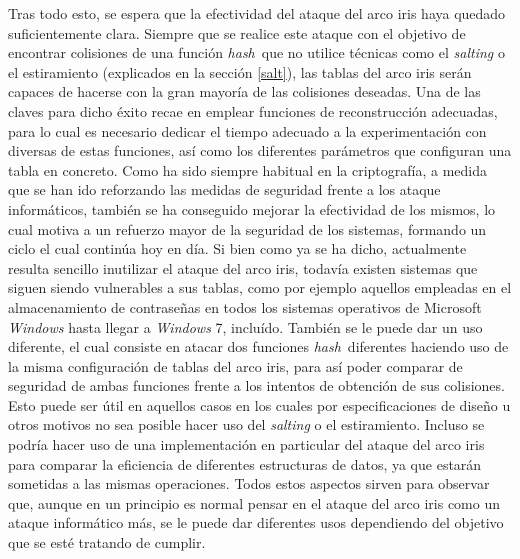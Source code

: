 \documentclass[12pt,spanish,listoffigures,listoftables,listofalgorithms]{tfgetsinf}
\newcommand{\hash}{\textit{hash}}
\begin{document}
Tras todo esto, se espera que la efectividad del ataque del arco iris haya quedado suficientemente clara. Siempre que se realice este ataque con el objetivo de encontrar colisiones de una función \hash~que no utilice técnicas como el \textit{salting} o el estiramiento (explicados en la sección \ref{salt}), las tablas del arco iris serán capaces de hacerse con la gran mayoría de las colisiones deseadas. Una de las claves para dicho éxito recae en emplear funciones de reconstrucción adecuadas, para lo cual es necesario dedicar el tiempo adecuado a la experimentación con diversas de estas funciones, así como los diferentes parámetros que configuran una tabla en concreto. Como ha sido siempre habitual en la criptografía, a medida que se han ido reforzando las medidas de seguridad frente a los ataque informáticos, también se ha conseguido mejorar la efectividad de los mismos, lo cual motiva a un refuerzo mayor de la seguridad de los sistemas, formando un ciclo el cual continúa hoy en día. Si bien como ya se ha dicho, actualmente resulta sencillo inutilizar el ataque del arco iris, todavía existen sistemas que siguen siendo vulnerables a sus tablas, como por ejemplo aquellos empleadas en el almacenamiento de contraseñas en todos los sistemas operativos de Microsoft \textit{Windows} hasta llegar a \textit{Windows} 7, incluído. También  se le puede dar un uso diferente, el cual consiste en atacar dos funciones \hash~diferentes haciendo uso de la misma configuración de tablas del arco iris, para así poder comparar de seguridad de ambas funciones frente a los intentos de obtención de sus colisiones. Esto puede ser útil en aquellos casos en los cuales por especificaciones de diseño u otros motivos no sea posible hacer uso del \textit{salting} o el estiramiento. Incluso se podría hacer uso de una implementación en particular del ataque del arco iris para comparar la eficiencia de diferentes estructuras de datos, ya que estarán sometidas a las mismas operaciones. Todos estos aspectos sirven para observar que, aunque en un principio es normal pensar en el ataque del arco iris como un ataque informático más, se le puede dar diferentes usos dependiendo del objetivo que se esté tratando de cumplir.




\end{document}
